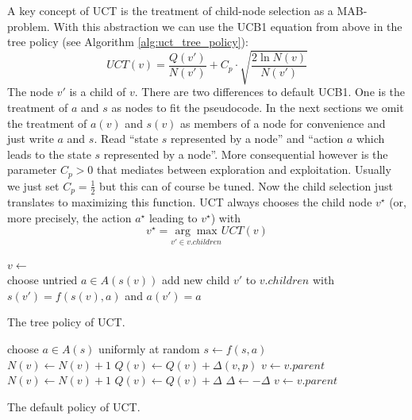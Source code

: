 A key concept of UCT is the treatment of child-node selection as a MAB-problem. With this abstraction we can use the UCB1 equation from above in the tree policy (see Algorithm \ref{alg:uct_tree_policy}):
\begin{equation*}
    UCT(v) = \frac{Q(v')}{N(v')}+C_p \cdot \sqrt{\frac{2 \ln N(v)}{N(v')}}
\end{equation*} The node $v'$ is a child of $v$. There are two differences to default UCB1. One is the treatment of $a$ and $s$ as nodes to fit the pseudocode. In the next sections we omit the treatment of $a(v)$ and $s(v)$ as members of a node for convenience and just write $a$ and $s$. Read \enquote{state $s$ represented by a node} and \enquote{action $a$ which leads to the state $s$ represented by a node}. More consequential however is the parameter $C_p > 0$ that mediates between exploration and exploitation. Usually we just set $C_p = \frac{1}{2} $ but this can of course be tuned. Now the child selection just translates to maximizing this function. UCT always chooses the child node $v^\star$ (or, more precisely, the action $a^\star$ leading to $v^\star$) with
\begin{equation*}
    v^\star = \underset{v' \in v.children}{\arg \max} UCT(v)
\end{equation*}  
\begin{algorithm}[ht!]
\begin{algorithmic}
    \State {}
    \Else
    \State $v \gets$ 
    \EndIf
    \EndWhile
\EndFunction \\
\State choose untried $a \in A(s(v))$
\State add new child $v'$ to $v.children$ with $s(v') = f(s(v),a)$ and $a(v') = a$
\State {}
\EndFunction \\
\State {}
\EndFunction
\end{algorithmic}
\caption{The tree policy of UCT.}
\label{alg:uct_tree_policy}
\end{algorithm}
\begin{algorithm}[ht!]
\begin{algorithmic}
\State choose $a \in A(s)$ uniformly at random
\State $s \gets f(s,a)$
\EndWhile
\State {}
\EndFunction \\

 
\State $N(v) \gets N(v) + 1$
\State $Q(v) \gets Q(v) + \Delta(v,p)$
\State $v \gets v.parent$
\EndWhile
\State $N(v) \gets N(v) + 1$
\State $Q(v) \gets Q(v) + \Delta$
\State $\Delta \gets - \Delta$
\State $v \gets v.parent$
\EndFunction
\end{algorithmic}
\caption{The default policy of UCT.}
\label{alg:uct_default_policy}
\end{algorithm}
